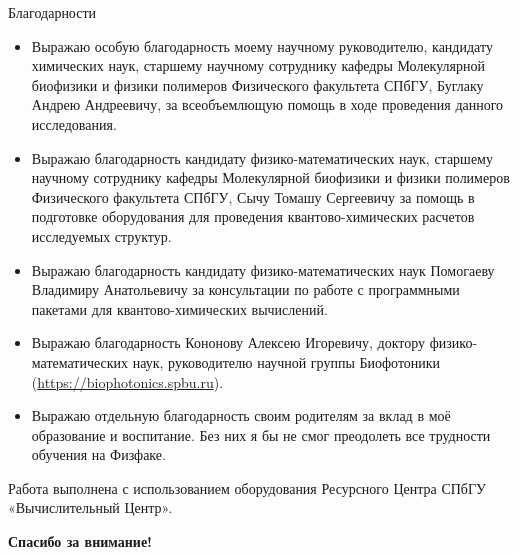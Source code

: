 \documentclass[10pt, aspectratio=169]{beamer}
\begin{document}
\begin{frame}{Благодарности}
	\small 
	\begin{itemize}
		\item Выражаю особую благодарность моему научному руководителю, кандидату химических наук, старшему научному сотруднику кафедры Молекулярной биофизики и физики полимеров Физического факультета СПбГУ, Буглаку Андрею Андреевичу, за всеобъемлющую помощь в ходе проведения данного исследования.
		\item Выражаю благодарность кандидату физико-математических наук, старшему научному сотруднику кафедры Молекулярной биофизики и физики полимеров Физического факультета СПбГУ, Сычу Томашу Сергеевичу за помощь в подготовке оборудования для проведения квантово-химических расчетов исследуемых структур.
		\item Выражаю благодарность кандидату физико-математических наук Помогаеву Владимиру Анатольевичу за консультации по работе с программными пакетами для квантово-химических вычислений.
		\item Выражаю благодарность Кононову Алексею Игоревичу, доктору физико-математических наук, руководителю научной группы Биофотоники (\href{https://biophotonics.spbu.ru}{https://biophotonics.spbu.ru}).
		\item Выражаю отдельную благодарность своим родителям за вклад в моё образование и воспитание. Без них я бы не смог преодолеть все трудности обучения на Физфаке.
	\end{itemize}
	\vfill
	\footnotesize{Работа выполнена с использованием оборудования Ресурсного Центра СПбГУ «Вычислительный Центр».}
\end{frame}

\begin{frame}[plain]
	\centering
	\huge{\textbf{Спасибо за внимание!}} 
\end{frame}
\end{document}
